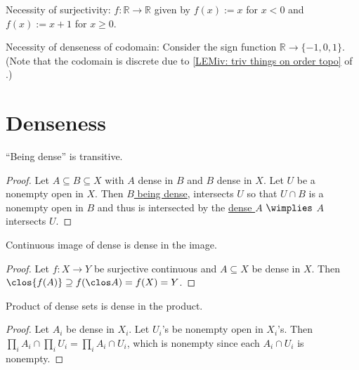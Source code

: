 	\begin{rmk}
		\begin{mylist}
			\item Necessity of surjectivity: $f\colon \mathbb{R\to R}$ given by $f(x) := x$ for $x < 0$ and $f(x) := x + 1$ for $x\ge 0$.
			
			\item Necessity of denseness of codomain: Consider the sign function $\mathbb R\to \{-1, 0, 1\}$. (Note that the codomain is discrete due to \ref{LEMiv: triv things on order topo} of .)
		\end{mylist}
	\end{rmk}
	



\section{Denseness}

	\begin{lem}\label{LEM: denseness is transitive}
		``Being dense'' is transitive.
	\end{lem}
	
	\begin{proof}
		Let $A\subseteq B\subseteq X$ with $A$ dense in $B$ and $B$ dense in $X$. Let $U$ be a nonempty open in $X$. Then \uline{$B$ being dense}, intersects $U$ so that $U\cap B$ is a nonempty open in $B$ and thus is intersected by the \uline{dense $A$} $\wimplies$ $A$ intersects $U$.
	\end{proof}
	
	
	\begin{lem}\label{LEM: cont img of dense is dense}
		Continuous image of dense is dense in the image.
	\end{lem}
	
	\begin{proof}
		Let $f\colon X\to Y$ be surjective continuous and $A\subseteq X$ be dense in $X$. Then $\clos{f(A)}\supseteq f(\clos A) = f(X) = Y$.
	\end{proof}
	
	
	\begin{lem}\label{LEM: prd of dense is dense}
		Product of dense sets is dense in the product.
	\end{lem}
	
	\begin{proof}
		Let $A_i$ be dense in $X_i$. Let $U_i$'s be nonempty open in $X_i$'s. Then $\prod_i A_i\cap \prod_i U_i = \prod_i A_i\cap U_i$, which is nonempty since each $A_i\cap U_i$ is nonempty.
	\end{proof}
	
